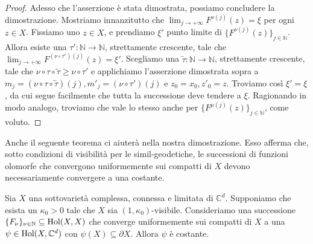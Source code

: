 \begin{proof}
    Adesso che l'asserzione è stata dimostrata, possiamo concludere la dimostrazione. Mostriamo innanzitutto che $\displaystyle\lim_{j\longrightarrow+\infty}F^{\nu(j)}(z)=\xi$ per ogni $z\in X$. Fissiamo uno $z\in X$, e prendiamo $\xi'$ punto limite di $\{F^{\nu(j)}(z)\}_{j\in\mathbb{N}}$. Allora esiste una $\tau':\mathbb{N}\longrightarrow\mathbb{N}$, strettamente crescente, tale che $\displaystyle \lim_{j\longrightarrow+\infty} F^{(\nu\circ\tau')(j)}(z)=\xi'$. Scegliamo una $\tilde{\tau}:\mathbb{N}\longrightarrow\mathbb{N}$, strettamente crescente, tale che $\nu\circ\tau\circ\tilde{\tau} \ge \nu\circ\tau'$ e applichiamo l'asserzione dimostrata sopra a $m_j=(\nu\circ\tau\circ\tilde{\tau})(j), m'_j=(\nu\circ\tau')(j)$ e $z_0=x_0,z'_0=z$. Troviamo così $\xi'=\xi$, da cui segue facilmente che tutta la successione deve tendere a $\xi$. Ragionando in modo analogo, troviamo che vale lo stesso anche per $\{F^{\mu(j)}(z)\}_{j\in\mathbb{N}}$, come voluto.
\end{proof}

Anche il seguente teorema ci aiuterà nella nostra dimostrazione. Esso afferma che, sotto condizioni di visibilità per le simil-geodetiche, le successioni di funzioni olomorfe che convergono uniformemente sui compatti di $X$ devono necessariamente convergere a una costante.

\begin{thm} \label{lim_is_const}
    Sia $X$ una sottovarietà complessa, connessa e limitata di $\mathbb{C}^d$. Supponiamo che esista un $\kappa_0>0$ tale che $X$ sia $(1,\kappa_0)$-visibile. Consideriamo una successione $\{F_\nu\}_{\nu\in\mathbb{N}} \subseteq \textnormal{Hol}(X,X)$ che converge uniformemente sui compatti di $X$ a una $\psi\in\textnormal{Hol}(X,\mathbb{C}^d)$ con $\psi(X)\subseteq\partial X$. Allora $\psi$ è costante.
\end{thm}

